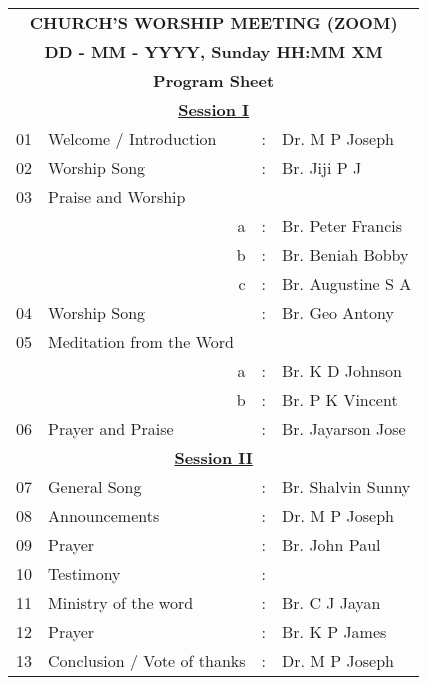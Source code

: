 \documentclass[12pt, a4paper]{article}
\begin{document}
\begin{center} %
    \begin{tabular}{l l c l}
        \multicolumn{4}{c}{\textbf{CHURCH’S WORSHIP MEETING (ZOOM)}} \\
        \multicolumn{4}{c}{\textbf{DD - MM - YYYY, Sunday HH:MM XM}} \\
        \multicolumn{4}{c}{\textbf{Program Sheet}}                   \\
        \multicolumn{4}{c}{\textbf{\underline{Session I}}}           \\
        01 & Welcome / Introduction      & : & Dr. M P Joseph        \\
        02 & Worship Song                & : & Br. Jiji P J          \\
        03 & Praise and Worship          &   &                       \\
           & \multicolumn{1}{r}{a}       & : & Br. Peter Francis     \\
           & \multicolumn{1}{r}{b}       & : & Br. Beniah Bobby      \\
           & \multicolumn{1}{r}{c}       & : & Br. Augustine S A     \\
        04 & Worship Song                & : & Br. Geo Antony        \\
        05 & Meditation from the Word    &   &                       \\
           & \multicolumn{1}{r}{a}       & : & Br. K D Johnson       \\
           & \multicolumn{1}{r}{b}       & : & Br. P K Vincent       \\
        06 & Prayer and Praise           & : & Br. Jayarson Jose     \\
        \multicolumn{4}{c}{\textbf{\underline{Session II}}}          \\
        07 & General Song                & : & Br. Shalvin Sunny     \\
        08 & Announcements               & : & Dr. M P Joseph        \\
        09 & Prayer                      & : & Br. John Paul         \\
        10 & Testimony                   & : &                       \\
        11 & Ministry of the word        & : & Br. C J Jayan         \\
        12 & Prayer                      & : & Br. K P James         \\
        13 & Conclusion / Vote of thanks & : & Dr. M P Joseph
    \end{tabular}
\end{center}
\end{document}
